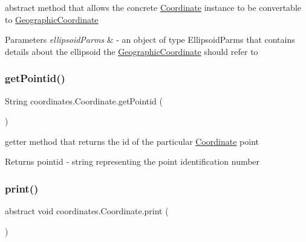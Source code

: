 abstract method that allows the concrete \hyperlink{classcoordinates_1_1_coordinate}{Coordinate} instance to be convertable to \hyperlink{classcoordinates_1_1_geographic_coordinate}{Geographic\+Coordinate} 


\begin{DoxyParams}{Parameters}
{\em ellipsoid\+Parms} & -\/ an object of type Ellipsoid\+Parms that contains details about the ellipsoid the \hyperlink{classcoordinates_1_1_geographic_coordinate}{Geographic\+Coordinate} should refer to \\
\hline
\end{DoxyParams}
\mbox{\label{classcoordinates_1_1_coordinate_ab0b1d8dc4fe371a2425e0cb505effafd}} 
\subsubsection{\texorpdfstring{get\+Pointid()}{getPointid()}}
{\footnotesize\ttfamily String coordinates.\+Coordinate.\+get\+Pointid (\begin{DoxyParamCaption}{ }\end{DoxyParamCaption})}



getter method that returns the id of the particular \hyperlink{classcoordinates_1_1_coordinate}{Coordinate} point 

\begin{DoxyReturn}{Returns}
pointid -\/ string representing the point identification number 
\end{DoxyReturn}
\mbox{\label{classcoordinates_1_1_coordinate_af2882da7117d4a312faf707df681042c}} 
\subsubsection{\texorpdfstring{print()}{print()}}
{\footnotesize\ttfamily abstract void coordinates.\+Coordinate.\+print (\begin{DoxyParamCaption}{ }\end{DoxyParamCaption})\hspace{0.3cm}{\ttfamily [abstract]}}



